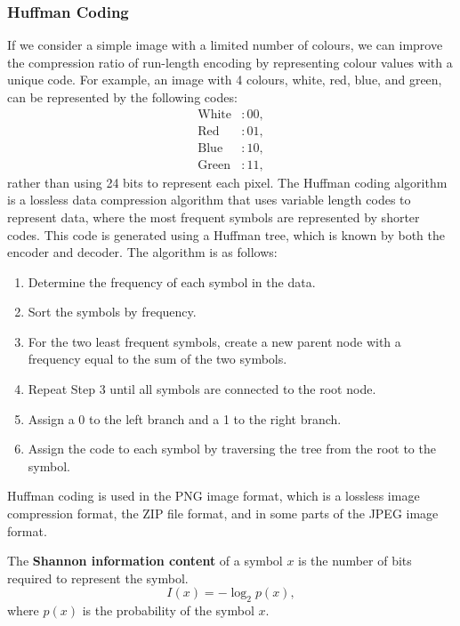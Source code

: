 \documentclass{article}
\begin{document}
\subsubsection{Huffman Coding}
If we consider a simple image with a limited number of colours, we can
improve the compression ratio of run-length encoding by representing
colour values with a unique code. For example, an image with 4 colours,
white, red, blue, and green, can be represented by the following codes:
\begin{align*}
    \text{White} & : 00, \\
    \text{Red}   & : 01, \\
    \text{Blue}  & : 10, \\
    \text{Green} & : 11,
\end{align*}
rather than using 24 bits to represent each pixel. The Huffman coding
algorithm is a lossless data compression algorithm that uses variable
length codes to represent data, where the most frequent symbols are
represented by shorter codes. This code is generated using a Huffman
tree, which is known by both the encoder and decoder. The algorithm is
as follows:
\begin{enumerate}
    \item Determine the frequency of each symbol in the data.
    \item Sort the symbols by frequency.
    \item For the two least frequent symbols, create a new parent node
          with a frequency equal to the sum of the two symbols.
    \item Repeat Step 3 until all symbols are connected to the root node.
    \item Assign a 0 to the left branch and a 1 to the right branch.
    \item Assign the code to each symbol by traversing the tree from the
          root to the symbol.
\end{enumerate}
Huffman coding is used in the PNG image format, which is a lossless
image compression format, the ZIP file format, and in some parts of the
JPEG image format.
\begin{definition}
    The \textbf{Shannon information content} of a symbol \(x\) is the
    number of bits required to represent the symbol.
    \begin{equation*}
        I\left( x \right) = -\log_2{p\left( x \right)},
    \end{equation*}
    where \(p\left( x \right)\) is the probability of the symbol \(x\).
\end{definition}
\end{document}
